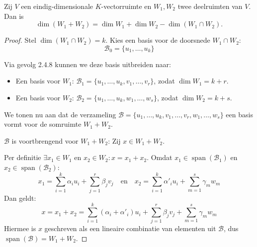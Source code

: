 \begin{stelling}
    Zij $V$ een eindig-dimensionale $K$-vectorruimte en $W_1, W_2$ twee deelruimten van $V$. Dan is
    \[ \dim(W_1 + W_2) = \dim W_1 + \dim W_2 - \dim(W_1 \cap W_2). \]
\end{stelling}
\begin{proof}
    Stel $\dim(W_1 \cap W_2) = k$. Kies een basis voor de doorsnede $W_1 \cap W_2$:
    $$ \mathcal{B}_0 = \{u_1, \dots, u_k\} $$

    Via gevolg 2.4.8 kunnen we deze basis uitbreiden naar:
    \begin{itemize}
        \item Een basis voor $W_1$: $\mathcal{B}_1 = \{u_1, \dots, u_k, v_1, \dots, v_r\}$, zodat $\dim W_1 = k + r$.
        \item Een basis voor $W_2$: $\mathcal{B}_2 = \{u_1, \dots, u_k, w_1, \dots, w_s\}$, zodat $\dim W_2 = k + s$.
    \end{itemize}

    We tonen nu aan dat de verzameling $\mathcal{B} = \{u_1, \dots, u_k, v_1, \dots, v_r, w_1, \dots, w_s\}$ een basis vormt voor de somruimte $W_1 + W_2$.

    $\mathcal{B}$ is voortbrengend voor $W_1 + W_2$:
    Zij $x \in W_1 + W_2$. 
    
    Per definitie $\exists x_1 \in W_1$ en $x_2 \in W_2: x = x_1 + x_2$.
    Omdat $x_1 \in \operatorname{span}(\mathcal{B}_1)$ en $x_2 \in \operatorname{span}(\mathcal{B}_2)$:
    $$ x_1 = \sum_{i=1}^k \alpha_i u_i + \sum_{j=1}^r \beta_j v_j \quad \text{en} \quad x_2 = \sum_{i=1}^k \alpha'_i u_i + \sum_{m=1}^s \gamma_m w_m $$
    Dan geldt:
    $$ x = x_1 + x_2 = \sum_{i=1}^k (\alpha_i + \alpha'_i) u_i + \sum_{j=1}^r \beta_j v_j + \sum_{m=1}^s \gamma_m w_m $$
    Hiermee is $x$ geschreven als een lineaire combinatie van elementen uit $\mathcal{B}$, dus $\operatorname{span}(\mathcal{B}) = W_1 + W_2$.


\end{proof}
